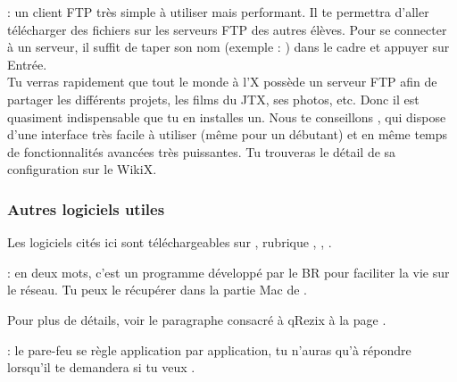   : un client FTP très simple à utiliser mais performant. Il te permettra d'aller télécharger des fichiers sur les serveurs FTP des autres élèves.
Pour se connecter à un serveur, il suffit de taper son nom (exemple : ) dans le cadre  et appuyer sur Entrée.\\
Tu verras rapidement que tout le monde à l'X possède un serveur FTP afin de partager les différents projets, les films du JTX, ses photos, etc. Donc il est quasiment indispensable que tu en installes un. Nous te conseillons , qui dispose d'une interface très facile à utiliser (même pour un débutant) et en même temps de fonctionnalités avancées très puissantes. Tu trouveras le détail de sa configuration sur le WikiX.

\subsubsection{Autres logiciels utiles}

Les logiciels cités ici sont téléchargeables sur , rubrique , , .

 \noindent{} : en deux mots, c'est un programme développé par le BR pour faciliter la vie sur le réseau. Tu peux le récupérer dans la partie Mac de \xshare.

\noindent Pour plus de détails, voir le paragraphe consacré à qRezix à la page \pageref{qrezix}.

\noindent {} : le pare-feu se règle application par application, tu n'auras qu'à répondre  lorsqu'il te demandera si tu veux .




